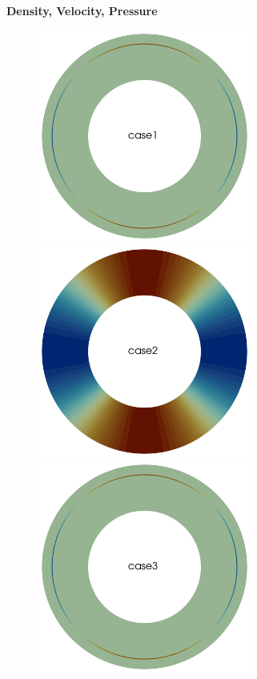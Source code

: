 \documentclass[12pt]{article}
\numberwithin{equation}{subsection}
\begin{document}
\newpage
\textbf{Density, Velocity, Pressure}
\begin{figure}[!htb]
	
	\begin{multicols}{4}
		\includegraphics[width=7cm]{./case1/rho_ana.png}\par
		\hspace{0.75in}
		\includegraphics[width=7cm]{./case2/rho_ana.png}\par
		\hspace{1.5in}
		\includegraphics[width=7cm]{./case3/rho_ana.png}\par

\end{multicols}
\end{figure}
\end{document}
